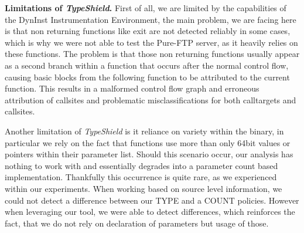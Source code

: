 \textbf{Limitations of \textit{TypeShield}.}
\label{section:limit}
First of all, we are limited by the capabilities of the DynInst Instrumentation Environment, the main problem,
we are facing here is that non returning functions like exit are not detected reliably in some cases, which is
why we were not able to test the Pure-FTP server, as it heavily relies on these functions. The problem is that
those non returning functions usually appear as a second branch within a function that occurs after the normal
control flow, causing basic blocks from the following function to be attributed to the current function. This
results in a malformed control flow graph and erroneous attribution of callsites and problematic misclassifications
for both calltargets and callsites.

Another limitation of \textit{TypeShield} is it reliance on variety within the binary, in particular we rely on
the fact that functions use more than only 64bit values or pointers within their parameter list. Should this
scenario occur, our analysis has nothing to work with and essentially degrades into a parameter count based
implementation. Thankfully this occurrence is quite rare, as we experienced within our experiments. When working
based on source level information, we could not detect a difference between our TYPE and a COUNT policies. 
However when leveraging our tool, we were able to detect differences, which reinforces the fact, that we do 
not rely on declaration of parameters but usage of those.
